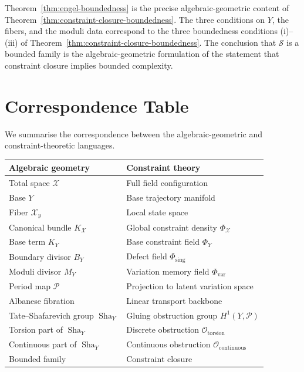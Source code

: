 \documentclass[11pt,openany]{book}
\newcommand{\Sha}{\operatorname{Sha}}
\begin{document}
\begin{remark}
Theorem~\ref{thm:engel-boundedness} is the precise
algebraic-geometric content of
Theorem~\ref{thm:constraint-closure-boundedness}.
The three conditions on $Y$, the fibers, and the moduli
data correspond to the three boundedness conditions
(i)--(iii) of Theorem~\ref{thm:constraint-closure-boundedness}.
The conclusion that $\mathcal{S}$ is a bounded family
is the algebraic-geometric formulation of the statement
that constraint closure implies bounded complexity.
\end{remark}

\section{Correspondence Table}
\label{sec:correspondence-table}

We summarise the correspondence between the
algebraic-geometric and constraint-theoretic languages.

\medskip
\begin{center}
\begin{tabular}{ll}
\toprule
\textbf{Algebraic geometry} & \textbf{Constraint theory} \\
\midrule
Total space $\mathcal{X}$ &
  Full field configuration \\
Base $Y$ &
  Base trajectory manifold \\
Fiber $\mathcal{X}_y$ &
  Local state space \\
Canonical bundle $K_{\mathcal{X}}$ &
  Global constraint density $\Phi_{\mathcal{X}}$ \\
Base term $K_Y$ &
  Base constraint field $\Phi_Y$ \\
Boundary divisor $B_Y$ &
  Defect field $\Phi_{\mathrm{sing}}$ \\
Moduli divisor $M_Y$ &
  Variation memory field $\Phi_{\mathrm{var}}$ \\
Period map $\mathcal{P}$ &
  Projection to latent variation space \\
Albanese fibration &
  Linear transport backbone \\
Tate--Shafarevich group $\Sha_Y$ &
  Gluing obstruction group $H^1(Y, \mathcal{P})$ \\
Torsion part of $\Sha_Y$ &
  Discrete obstruction $\mathcal{O}_{\mathrm{torsion}}$ \\
Continuous part of $\Sha_Y$ &
  Continuous obstruction $\mathcal{O}_{\mathrm{continuous}}$ \\
Bounded family &
  Constraint closure \\
\bottomrule
\end{tabular}
\end{center}
\medskip
\end{document}
